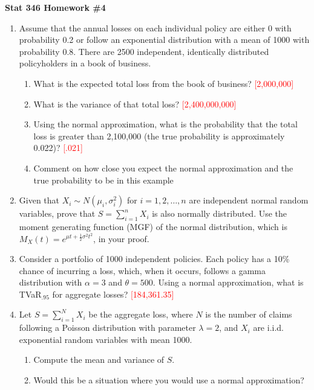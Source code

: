 \documentclass{article}
\begin{document}
\begin{center}
\textbf{Stat 346 Homework \#4}\\
\vspace{0.3in}
\end{center}
\begin{enumerate}
\item
    Assume that the annual losses on each individual policy are either 0 with probability 0.2 or follow an exponential distribution with a mean of 1000 with probability 0.8. There are 2500 independent, identically distributed policyholders in a book of business.
    \begin{enumerate}
        \item What is the expected total loss from the book of business? \textcolor{red}{[2,000,000]}
        \item What is the variance of that total loss? \textcolor{red}{[2,400,000,000]}
        \item Using the normal approximation, what is the probability that the total loss is greater than 2,100,000 (the true probability is approximately 0.022)? \textcolor{red}{[.021]}
        \item Comment on how close you expect the normal approximation and the true probability to be in this example 
    \end{enumerate}
    
 \item 
  Given that $X_i \sim N(\mu_i, \sigma_i^2)$ for $i=1,2,\ldots,n$ are independent normal random variables, prove that $S = \sum_{i=1}^{n} X_i$ is also normally distributed. Use the moment generating function (MGF) of the normal distribution, which is $M_X(t) = e^{\mu t + \frac{1}{2} \sigma^2 t^2}$, in your proof.

\item
  Consider a portfolio of 1000 independent policies. Each policy has a 10\% chance of incurring a loss, which, when it occurs, follows a gamma distribution with $\alpha = 3$ and $\theta = 500$. Using a normal approximation, what is TVaR$_{.95}$ for aggregate losses? \textcolor{red}{[184,361.35]}

\item 
Let $S = \sum_{i=1}^N X_i$ be the aggregate loss, where $N$ is the number of claims following a Poisson distribution with parameter $\lambda = 2$, and $X_i$ are i.i.d. exponential random variables with mean 1000.
    \begin{enumerate}
        \item    Compute the mean and variance of $S$.
        \item Would this be a situation where you would use a normal approximation?
    \end{enumerate}



\end{enumerate}
\end{document}
